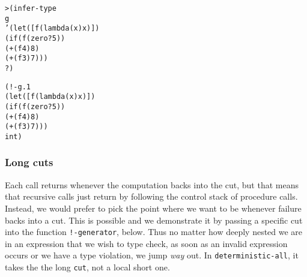 \begin{alltt}
> (infer-type 
    g
    '(let ([f (lambda (x) x)])
             (if (f (zero? 5))
               (+ (f 4) 8)
               (+ (f 3) 7)))
    ?)

(!- g.1
    (let ([f (lambda (x) x)])
      (if (f (zero? 5))
        (+ (f 4) 8)
        (+ (f 3) 7)))
    int)
\end{alltt}

\subsubsection{Long cuts}
Each call returns whenever the computation backs into the cut, but
that means that recursive calls just return by following the control
stack of procedure calls.  Instead, we would prefer to pick the point
where we want to be whenever failure backs into a cut.  This is
possible and we demonstrate it by passing a specific cut into the
function \texttt{!-generator}, below.  Thus no matter how deeply
nested we are in an expression that we wish to type check, as soon as
an invalid expression occurs or we have a type violation, we jump
\emph{way} out.  In \texttt{deterministic-all}, it takes the
the long \texttt{cut}, not a local short one.

